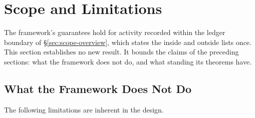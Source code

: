 \section{Scope and Limitations}
\label{sec:scope-limitations}

The framework's guarantees hold for activity recorded within the ledger boundary of \S\ref{sec:scope-overview}, which states the inside and outside lists once. This section establishes no new result. It bounds the claims of the preceding sections: what the framework does not do, and what standing its theorems have.

\subsection{What the Framework Does Not Do}

The following limitations are inherent in the design.

